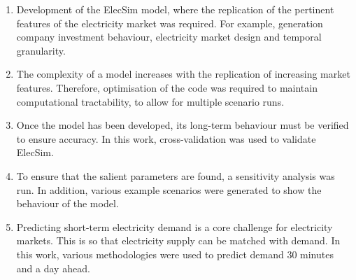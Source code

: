 \documentclass[11pt]{report}
\begin{document}
\begin{enumerate}
	\item Development of the ElecSim model, where the replication of the pertinent features of the electricity market was required. For example, generation company investment behaviour, electricity market design and temporal granularity.
	\item The complexity of a model increases with the replication of increasing market features. Therefore, optimisation of the code was required to maintain computational tractability, to allow for multiple scenario runs. 
	\item Once the model has been developed, its long-term behaviour must be verified to ensure accuracy. In this work, cross-validation was used to validate ElecSim.
	\item To ensure that the salient parameters are found, a sensitivity analysis was run. In addition, various example scenarios were generated to show the behaviour of the model.
	\item Predicting short-term electricity demand is a core challenge for electricity markets. This is so that electricity supply can be matched with demand. In this work, various methodologies were used to predict demand 30 minutes and a day ahead. 
\end{enumerate}
\end{document}
